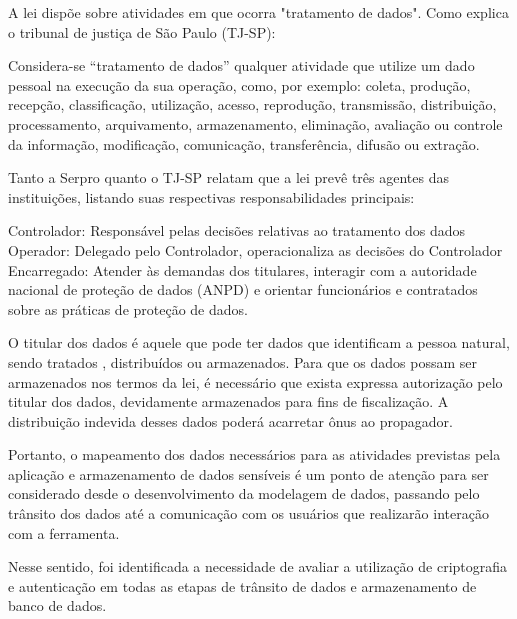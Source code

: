 \documentclass[
    12pt,               %
    openright,          %
    oneside,
    a4paper,            %
    BIBLATEX,           %
    TODO,               %
    english,            %
    brazil              %
    ]{ifsp-spo-inf-ctds}
\begin{document}
            A lei dispõe sobre atividades em que ocorra "tratamento de dados". Como explica o tribunal de justiça de São Paulo (TJ-SP):

            \begin{citacao}
                Considera-se “tratamento de dados” qualquer atividade que utilize um dado pessoal na execução da sua operação, como, por exemplo: coleta, produção, recepção, classificação, utilização, acesso, reprodução, transmissão, distribuição, processamento, arquivamento, armazenamento, eliminação, avaliação ou controle da informação, modificação, comunicação, transferência, difusão ou extração.
            \end{citacao}                                     

            Tanto a Serpro quanto o TJ-SP relatam que a lei prevê três agentes das instituições, listando suas respectivas responsabilidades principais:
            
            \begin{citacao}
                Controlador: Responsável pelas decisões relativas ao tratamento dos dados
                Operador: Delegado pelo Controlador, operacionaliza as decisões do Controlador
                Encarregado: Atender às demandas dos titulares, interagir com a autoridade nacional de proteção de dados (ANPD) e orientar funcionários e contratados sobre as práticas de proteção de dados.
            \end{citacao}  

            O titular dos dados é aquele que pode ter dados que identificam a pessoa natural, sendo tratados , distribuídos ou armazenados. Para que os dados possam ser armazenados nos termos da lei, é necessário que exista expressa autorização pelo titular dos dados, devidamente armazenados para fins de fiscalização. A distribuição indevida desses dados poderá acarretar ônus ao propagador. 
            
            Portanto, o mapeamento dos dados necessários para as atividades previstas pela aplicação e armazenamento de dados sensíveis é um ponto de atenção para ser considerado desde o desenvolvimento da modelagem de dados, passando pelo trânsito dos dados até a comunicação com os usuários que realizarão interação com a ferramenta.
            
            Nesse sentido, foi identificada a necessidade de avaliar a utilização de criptografia e autenticação em todas as etapas de trânsito de dados e armazenamento de banco de dados.
\end{document}
